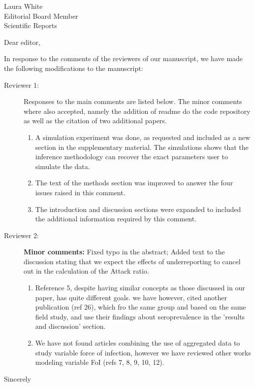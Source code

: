 \documentclass[a4paper,10pt]{letter}
\begin{document}

\begin{letter}{Laura White\\Editorial Board Member\\Scientific Reports }
\address{Escola de Matem\'atica Aplicada\\Funda\c{c}\~ao Getulio Vargas 
(FGV)\\Rio de Janeiro -- RJ\\Brazil.}

\opening{Dear editor,}

In response to the comments of the reviewers of our manuscript, we have made 
the following modifications to the manuscript:

\begin{description}
 \item[Reviewer 1:] Responses to the main comments are listed below. The minor 
comments where also accepted, namely the addition of readme do the code 
repository as well as the citation of two  additional papers. 
 
 \begin{enumerate}
  \item A simulation experiment was done, as requested and included as a new 
section in the supplementary material. The simulations shows that the inference 
methodology can recover the exact parameters user to simulate  the data.
\item The text of the methods section was improved to answer the four issues 
raised in this comment.
\item The introduction and discussion sections were expanded to included the 
additional information required by this comment.
 \end{enumerate}

 \item [Reviewer 2:] \textbf{Minor comments:} Fixed typo in the abstract; Added 
text to the discussion stating that we expect the effects of underreporting to 
cancel out in the calculation of the Attack ratio. 
 \begin{enumerate}
  \item Reference 5, despite having similar concepts as those discussed in our 
paper, has quite different goals. we have however, cited another publication 
(ref 26), which fro the same group and based on the same field study, and use 
their findings about seroprevalence in the 'results and discussion' section.
\item We have not found articles combining the use of aggregated data to study 
variable force of infection, however we have reviewed other works modeling 
variable FoI (refs 7, 8, 9, 10, 12).
 \end{enumerate}

\end{description}



\signature{Flávio Codeço Coelho\\Professor}

\closing{Sincerely}


\end{letter}
\end{document}
